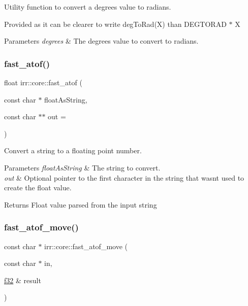 Utility function to convert a degrees value to radians. 

Provided as it can be clearer to write deg\+To\+Rad(\+X) than D\+E\+G\+T\+O\+R\+AD $\ast$ X 
\begin{DoxyParams}{Parameters}
{\em degrees} & The degrees value to convert to radians. \\
\hline
\end{DoxyParams}
\mbox{\label{namespaceirr_1_1core_af69b7d3604a1089438106fcce3cedb34}} 
\subsubsection{\texorpdfstring{fast\+\_\+atof()}{fast\_atof()}}
{\footnotesize\ttfamily float irr\+::core\+::fast\+\_\+atof (\begin{DoxyParamCaption}\item[{const char $\ast$}]{float\+As\+String,  }\item[{const char $\ast$$\ast$}]{out = {} }\end{DoxyParamCaption})\hspace{0.3cm}{\ttfamily [inline]}}



Convert a string to a floating point number. 


\begin{DoxyParams}{Parameters}
{\em float\+As\+String} & The string to convert. \\
\hline
{\em out} & Optional pointer to the first character in the string that wasn\textquotesingle{}t used to create the float value. \\
\hline
\end{DoxyParams}
\begin{DoxyReturn}{Returns}
Float value parsed from the input string 
\end{DoxyReturn}
\mbox{\label{namespaceirr_1_1core_a08b80934d2f323dd2a7df6acd807b656}} 
\subsubsection{\texorpdfstring{fast\+\_\+atof\+\_\+move()}{fast\_atof\_move()}}
{\footnotesize\ttfamily const char $\ast$ irr\+::core\+::fast\+\_\+atof\+\_\+move (\begin{DoxyParamCaption}\item[{const char $\ast$}]{in,  }\item[{\hyperlink{namespaceirr_a0277be98d67dc26ff93b1a6a1d086b07}{f32} \&}]{result }\end{DoxyParamCaption})\hspace{0.3cm}{\ttfamily [inline]}}



